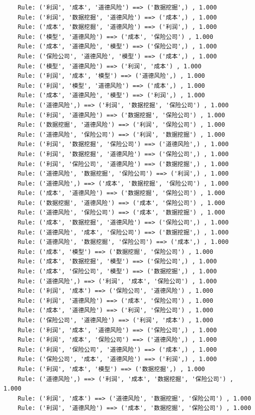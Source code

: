 \documentclass[lang=cn,11pt,a4paper,cite=authoryear]{elegantpaper}
\begin{document}
\begin{lstlisting}
	Rule: ('利润', '成本', '道德风险') ==> ('数据挖掘',) , 1.000
	Rule: ('利润', '数据挖掘', '道德风险') ==> ('成本',) , 1.000
	Rule: ('成本', '数据挖掘', '道德风险') ==> ('利润',) , 1.000
	Rule: ('模型', '道德风险') ==> ('成本', '保险公司') , 1.000
	Rule: ('成本', '道德风险', '模型') ==> ('保险公司',) , 1.000
	Rule: ('保险公司', '道德风险', '模型') ==> ('成本',) , 1.000
	Rule: ('模型', '道德风险') ==> ('利润', '成本') , 1.000
	Rule: ('利润', '成本', '模型') ==> ('道德风险',) , 1.000
	Rule: ('利润', '模型', '道德风险') ==> ('成本',) , 1.000
	Rule: ('成本', '道德风险', '模型') ==> ('利润',) , 1.000
	Rule: ('道德风险',) ==> ('利润', '数据挖掘', '保险公司') , 1.000
	Rule: ('利润', '道德风险') ==> ('数据挖掘', '保险公司') , 1.000
	Rule: ('数据挖掘', '道德风险') ==> ('利润', '保险公司') , 1.000
	Rule: ('道德风险', '保险公司') ==> ('利润', '数据挖掘') , 1.000
	Rule: ('利润', '数据挖掘', '保险公司') ==> ('道德风险',) , 1.000
	Rule: ('利润', '数据挖掘', '道德风险') ==> ('保险公司',) , 1.000
	Rule: ('利润', '保险公司', '道德风险') ==> ('数据挖掘',) , 1.000
	Rule: ('道德风险', '数据挖掘', '保险公司') ==> ('利润',) , 1.000
	Rule: ('道德风险',) ==> ('成本', '数据挖掘', '保险公司') , 1.000
	Rule: ('成本', '道德风险') ==> ('数据挖掘', '保险公司') , 1.000
	Rule: ('数据挖掘', '道德风险') ==> ('成本', '保险公司') , 1.000
	Rule: ('道德风险', '保险公司') ==> ('成本', '数据挖掘') , 1.000
	Rule: ('成本', '数据挖掘', '道德风险') ==> ('保险公司',) , 1.000
	Rule: ('道德风险', '成本', '保险公司') ==> ('数据挖掘',) , 1.000
	Rule: ('道德风险', '数据挖掘', '保险公司') ==> ('成本',) , 1.000
	Rule: ('成本', '模型') ==> ('数据挖掘', '保险公司') , 1.000
	Rule: ('成本', '数据挖掘', '模型') ==> ('保险公司',) , 1.000
	Rule: ('成本', '保险公司', '模型') ==> ('数据挖掘',) , 1.000
	Rule: ('道德风险',) ==> ('利润', '成本', '保险公司') , 1.000
	Rule: ('利润', '成本') ==> ('保险公司', '道德风险') , 1.000
	Rule: ('利润', '道德风险') ==> ('成本', '保险公司') , 1.000
	Rule: ('成本', '道德风险') ==> ('利润', '保险公司') , 1.000
	Rule: ('保险公司', '道德风险') ==> ('利润', '成本') , 1.000
	Rule: ('利润', '成本', '道德风险') ==> ('保险公司',) , 1.000
	Rule: ('利润', '成本', '保险公司') ==> ('道德风险',) , 1.000
	Rule: ('利润', '保险公司', '道德风险') ==> ('成本',) , 1.000
	Rule: ('保险公司', '成本', '道德风险') ==> ('利润',) , 1.000
	Rule: ('利润', '成本', '模型') ==> ('数据挖掘',) , 1.000
	Rule: ('道德风险',) ==> ('利润', '成本', '数据挖掘', '保险公司') , 1.000
	Rule: ('利润', '成本') ==> ('道德风险', '数据挖掘', '保险公司') , 1.000
	Rule: ('利润', '道德风险') ==> ('成本', '数据挖掘', '保险公司') , 1.000

\end{lstlisting}
\end{document}
